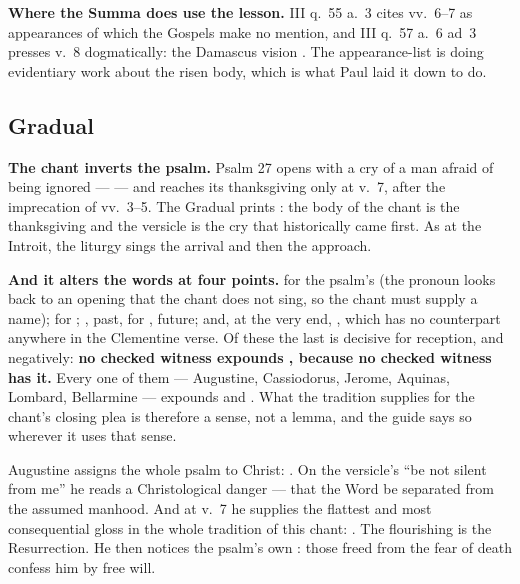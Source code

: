 \textbf{Where the Summa does use the lesson.}  III
q.~55 a.~3 cites vv.~6--7 as appearances of which the Gospels make no mention,
and III q.~57 a.~6 ad~3 presses v.~8 dogmatically: the Damascus vision
. The appearance-list is doing evidentiary work about the risen
body, which is what Paul laid it down to do.

\elementguard
\subsection*{Gradual }


\textbf{The chant inverts the psalm.} Psalm 27 opens with a cry of a man afraid
of being ignored ---  --- and reaches
its thanksgiving only at v.~7, after the imprecation of vv.~3--5. The Gradual
prints : the body of the chant is the thanksgiving and the
versicle is the cry that historically came first. As at the Introit, the
liturgy sings the arrival and then the approach.

\textbf{And it alters the words at four points.}  for the psalm's
 (the pronoun looks back to an opening  that the chant does not sing, so the chant must supply a name);
 for ; , past, for
, future; and, at the very end, , which
has no counterpart anywhere in the Clementine verse. Of these the last is
decisive for reception, and negatively: \textbf{no checked witness expounds
, because no checked witness has it.} Every one of them
--- Augustine, Cassiodorus, Jerome, Aquinas, Lombard, Bellarmine --- expounds
 and . What the tradition supplies for
the chant's closing plea is therefore a sense, not a lemma, and the guide says
so wherever it uses that sense.

\begin{witnessnote}
Augustine assigns the whole psalm to Christ: . On the versicle's ``be not silent from
me'' he reads a Christological danger --- that the Word be separated from the
assumed manhood. And at v.~7 he supplies the flattest and most consequential
gloss in the whole tradition of this chant: . The flourishing is the Resurrection. He then
notices the psalm's own : those freed from the fear of
death confess him by free will.
\end{witnessnote}

